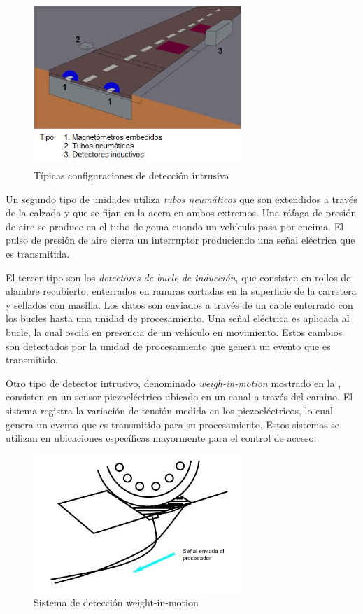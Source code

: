 \begin{figure}[h]
	\centering
	\includegraphics[width=0.7\textwidth]{capitulos/3/figuras/figura1.jpg}
	\caption{\label{fig:intrusiva} Típicas configuraciones de detección intrusiva}	
\end{figure}

Un segundo tipo de unidades utiliza \emph{tubos neumáticos} que son extendidos a través de la calzada y que se fijan en la acera en ambos extremos. Una ráfaga de presión de aire se produce en el tubo de goma cuando un vehículo pasa por encima. El pulso de presión de aire cierra un interruptor produciendo una señal eléctrica que es transmitida.

El tercer tipo son los \emph{detectores de bucle de inducción}, que consisten en rollos de alambre recubierto, enterrados en ranuras cortadas en la superficie de la carretera y sellados con masilla. Los datos son enviados a través de un cable enterrado con los bucles hasta una unidad de procesamiento. Una señal eléctrica es aplicada al bucle, la cual oscila en presencia de un vehículo en movimiento. Estos cambios son detectados por la unidad de procesamiento que genera un evento que es transmitido.

Otro tipo de detector intrusivo, denominado \emph{weigh-in-motion} mostrado en la , consisten en un sensor piezoeléctrico ubicado en un canal a través del camino. El sistema registra la variación de tensión medida en los piezoeléctricos, lo cual genera un evento que es transmitido para su procesamiento. Estos sistemas  se utilizan en ubicaciones específicas mayormente para el control de acceso.

\begin{figure}[h]
	\centering
	\includegraphics[width=0.7\textwidth]{capitulos/3/figuras/figura2.jpg}
	\caption{\label{fig:Weight-In-Motion}  Sistema de detección weight-in-motion}	
\end{figure}

